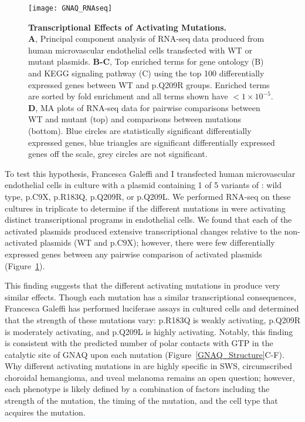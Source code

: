 \begin{figure}[bp!]
\begin{center}
\texttt{[image: GNAQ\_RNAseq]}
\end{center}
\caption[Transcriptional Effects of Activating  Mutations]{\textbf{Transcriptional Effects of Activating  Mutations.} \\ \textbf{A}, Principal component analysis of RNA-seq data produced from human microvascular endothelial cells transfected with WT or mutant  plasmids. \textbf{B-C}, Top enriched terms for gene ontology (B) and KEGG signaling pathway (C) using the top 100 differentially expressed genes between WT and p.Q209R groups. Enriched terms are sorted by fold enrichment and all terms shown have  $< 1 \times 10^{-5}$. \textbf{D}, MA plots of RNA-seq data for pairwise comparisons between WT and mutant  (top) and comparisons between mutations (bottom). Blue circles are statistically significant differentially expressed genes, blue triangles are significant differentially expressed genes off the scale, grey circles are not significant.}
\label{GNAQ_RNAseq}
\end{figure}
To test this hypothesis, Francesca Galeffi and I transfected human microvascular endothelial cells in culture with a plasmid containing 1 of 5 variants of : wild type, p.C9X, p.R183Q, p.Q209R, or p.Q209L. We performed RNA-seq on these cultures in triplicate to determine if the different mutations in  were activating distinct transcriptional programs in endothelial cells. We found that each of the activated  plasmids produced extensive transcriptional changes relative to the non-activated  plasmids (WT and p.C9X); however, there were few differentially expressed genes between any pairwise comparison of activated  plasmids (Figure~\ref{GNAQ_RNAseq}).

This finding suggests that the different activating mutations in  produce very similar effects. Though each mutation has a similar transcriptional consequences, Francesca Galeffi has performed luciferase assays in cultured cells and determined that the strength of these mutations vary: p.R183Q is weakly activating, p.Q209R is moderately activating, and p.Q209L is highly activating. Notably, this finding is consistent with the predicted number of polar contacts with GTP in the catalytic site of GNAQ upon each mutation (Figure~\ref{GNAQ_Structure}C-F). Why different activating mutations in  are highly specific in SWS, circumscribed choroidal hemangioma, and uveal melanoma remains an open question; however, each phenotype is likely defined by a combination of factors including the strength of the mutation, the timing of the mutation, and the cell type that acquires the mutation.







